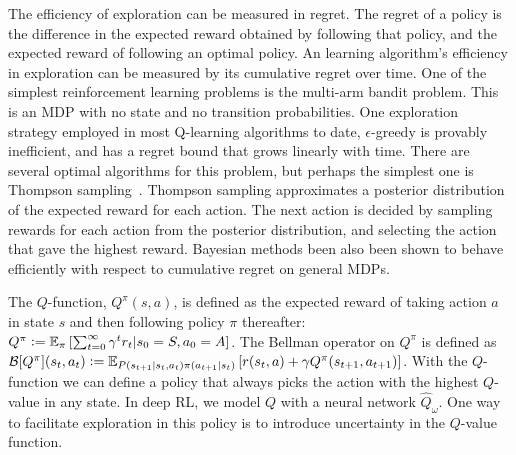\documentclass[]{uai2021} %
\newcommand{\defeq}{\vcentcolon=}
\newcommand{\E}{\mathbb{E}}
\newcommand{\B}{\mathcal{B}}
\begin{document}
The efficiency of exploration can be measured in regret.
The regret of a policy is the difference in the expected reward obtained by
following that policy, and the expected reward of following an optimal policy.
An learning algorithm's efficiency in exploration can be measured by its
cumulative regret over time. One of the simplest reinforcement learning 
problems is the multi-arm bandit problem. This is an MDP with no state and no
transition probabilities. One exploration strategy employed in most Q-learning
algorithms to date, \(\epsilon\)-greedy is provably inefficient, and has a
regret bound that grows linearly with time. There are several optimal algorithms
for this problem, but perhaps the simplest one is Thompson sampling~\citep{thompson_likelihood_1933}.
Thompson sampling approximates a posterior distribution of the expected reward
for each action. The next action is decided by sampling rewards for each action
from the posterior distribution, and selecting the action that gave the highest
reward. Bayesian methods been also been shown to behave efficiently with respect
to cumulative regret \cite{osband_generalization_2016} on general MDPs.


The \(Q\)-function, \(Q^\pi(s,a)\), is defined as the expected reward of taking action
\(a\) in state \(s\) and then following policy \(\pi\) thereafter:
\(Q^\pi \defeq \E_\pi \left[ \sum_{t=0}^\infty \gamma^t r_t \vert s_0=S, a_0=A \right]\).
The Bellman operator on \(Q^\pi\) is defined as
\(\B[Q^\pi](s_t,a_t) \defeq \E_{P(s_{t+1} \vert s_t, a_t)\pi(a_{t+1} \vert s_t)}
\left[ r(s_t, a) + \gamma Q^\pi(s_{t+1}, a_{t+1}) \right]\). With the
\(Q\)-function we can define a policy that always picks the action with the 
highest \(Q\)-value in any state. In deep RL, we model \(Q\) with a
neural network \(\hat{Q}_\omega\). One way to facilitate exploration in this
policy is to introduce uncertainty in the
\(Q\)-value function.
\end{document}
